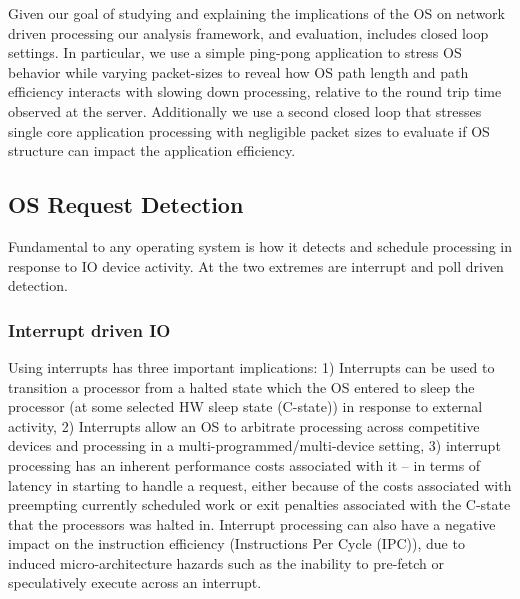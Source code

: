 Given our goal of studying and explaining the implications of the OS on network driven processing our analysis framework, and evaluation, includes closed loop settings.  In particular, we use a simple ping-pong application to stress OS behavior while varying packet-sizes to reveal how OS path length and path efficiency interacts with slowing down processing, relative to the round trip time observed at the server.  Additionally we use a second closed loop that stresses single core application processing with negligible packet sizes to evaluate if OS structure can impact the application efficiency.  

\subsection{OS Request Detection}

Fundamental to any operating system is how it detects and schedule processing in response to IO device activity.  At the two extremes are interrupt and poll driven detection.  

\subsubsection{Interrupt driven IO}
\label{sec:workflow:interruptio}
Using interrupts has three important implications: 1) Interrupts can be used to transition a processor from a halted state which the OS entered to sleep the processor (at some selected HW sleep state (C-state)) in response to external activity, 2)  Interrupts allow an OS to arbitrate processing across competitive devices and processing in a multi-programmed/multi-device setting, 3) interrupt processing has an inherent performance costs associated with it -- in terms of latency in starting to handle a request, either because of the costs associated with preempting currently scheduled work\cite{whenpollisbetter} or exit penalties associated with the C-state that the processors was halted in\cite{cpuidle_policy}. Interrupt processing can also have a negative impact on the instruction efficiency (Instructions Per Cycle (IPC)), due to induced micro-architecture hazards such as the inability to pre-fetch or speculatively execute across an interrupt.

